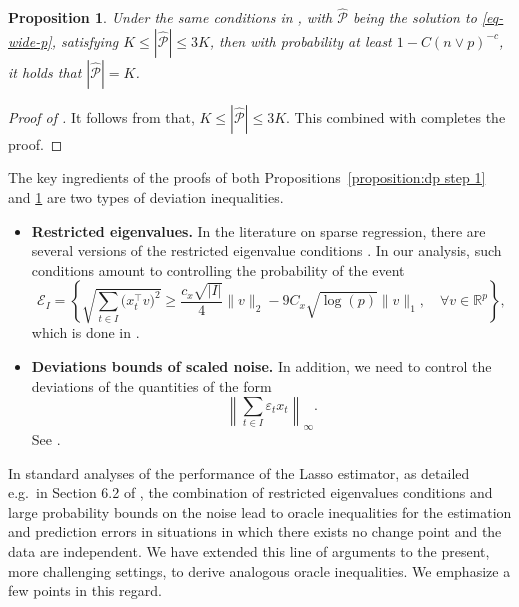 \documentclass[twoside]{article}
\newtheorem{proposition}[theorem]{Proposition}
\begin{document}

\begin{proposition}\label{prop-2}
Under the same conditions in , with $\widehat{\mathcal{P}}$ being the solution to \eqref{eq-wide-p}, satisfying $K \leq |\widehat{\mathcal{P}}| \leq 3K$, then with probability at least $1 - C(n \vee p)^{-c}$, it holds that $|\widehat{\mathcal{P}}| = K$.	
\end{proposition}


\begin{proof}[Proof of ]
	It follows from  that, $K \leq |\widehat{\mathcal{P}}| \leq 3K$.  This combined with  completes the proof.
\end{proof}

The key ingredients of the proofs of both Propositions~\ref{proposition:dp step 1} and \ref{prop-2} are two types of deviation inequalities.  
	\begin{itemize}
		\item \textbf{Restricted eigenvalues.}  In the literature on sparse regression, there are several versions of the restricted eigenvalue conditions \citep[see, e.g.][]{buhlmann2011statistics}.  In our analysis, such conditions amount to controlling the probability of the event
			\[
				\mathcal{E}_I = \left\{\sqrt{\sum_{t \in I} \bigl(x_t^{\top}v\bigr)^2} \geq \frac{c_x\sqrt{|I|}}{4} \|v\|_2 - 9 C_x \sqrt{\log(p)}\|v\|_1, \quad \forall v \in \mathbb{R}^p \right\},
			\]
			which is done in .
		\item \textbf{Deviations bounds of scaled noise.}  In addition, we need to control the deviations of the quantities of the form
			\begin{equation}\label{eq-lambda-rate-determ}
				\left\|\sum_{t \in I} \varepsilon_t x_t \right\|_{\infty}.
			\end{equation}
			See .
	\end{itemize}
	
In standard analyses of the performance of the Lasso estimator, as detailed e.g.~in Section 6.2 of \cite{buhlmann2011statistics}, the combination of restricted eigenvalues conditions and large probability bounds on the noise lead to oracle inequalities for the estimation and prediction errors in situations in which there exists no change point and the data are independent. We have extended this line of arguments to the present, more challenging settings, to derive analogous oracle inequalities.  We emphasize a few points in this regard.
\end{document}
